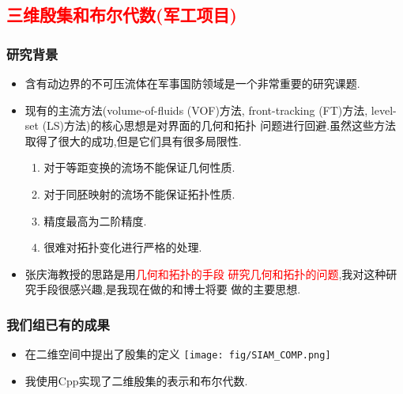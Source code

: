 \documentclass[UTF8]{ctexbeamer}	%
\theoremstyle{plain}
\theoremstyle{definition}
\theoremstyle{remark}
\numberwithin{equation}{section}
\begin{document}
\subsection{\textcolor{red}{三维殷集和布尔代数(军工项目)}}
\begin{frame}
    \frametitle{研究背景}
    \begin{itemize}
        \item 含有动边界的不可压流体在军事国防领域是一个非常重要的研究课题.
        \item 现有的主流方法(volume-of-fluids (VOF)方法, front-tracking
        (FT)方法, level-set (LS)方法)的核心思想是对界面的几何和拓扑
        问题进行回避.虽然这些方法取得了很大的成功,但是它们具有很多局限性.
        \begin{enumerate}
            \item 对于等距变换的流场不能保证几何性质.
            \item 对于同胚映射的流场不能保证拓扑性质.
            \item 精度最高为二阶精度.
            \item 很难对拓扑变化进行严格的处理.
        \end{enumerate}
        \item 张庆海教授的思路是用\textcolor{red}{几何和拓扑的手段
        研究几何和拓扑的问题},我对这种研究手段很感兴趣,是我现在做的和博士将要
        做的主要思想.
    \end{itemize}
\end{frame}
\begin{frame}
    \frametitle{我们组已有的成果}
    \begin{itemize}
        \item 在二维空间中提出了殷集的定义
        \texttt{[image: fig/SIAM\_COMP.png]}
        \item 我使用Cpp实现了二维殷集的表示和布尔代数.
    \end{itemize}
\end{frame}
\end{document}
